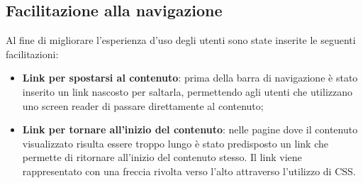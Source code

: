 \subsection{Facilitazione alla navigazione}
Al fine di migliorare l'esperienza d'uso degli utenti sono state inserite le seguenti facilitazioni:
\begin{itemize}
	\item \textbf{Link per spostarsi al contenuto}: prima della barra di navigazione è stato inserito un link nascosto per saltarla, permettendo agli utenti che utilizzano uno screen reader di passare direttamente al contenuto;
	\item \textbf{Link per tornare all'inizio del contenuto}: nelle pagine dove il contenuto visualizzato risulta essere troppo lungo è stato predisposto un link che permette di ritornare all'inizio del contenuto stesso. Il link viene rappresentato con una freccia rivolta verso l'alto attraverso l'utilizzo di CSS.
\end{itemize}
\newpage